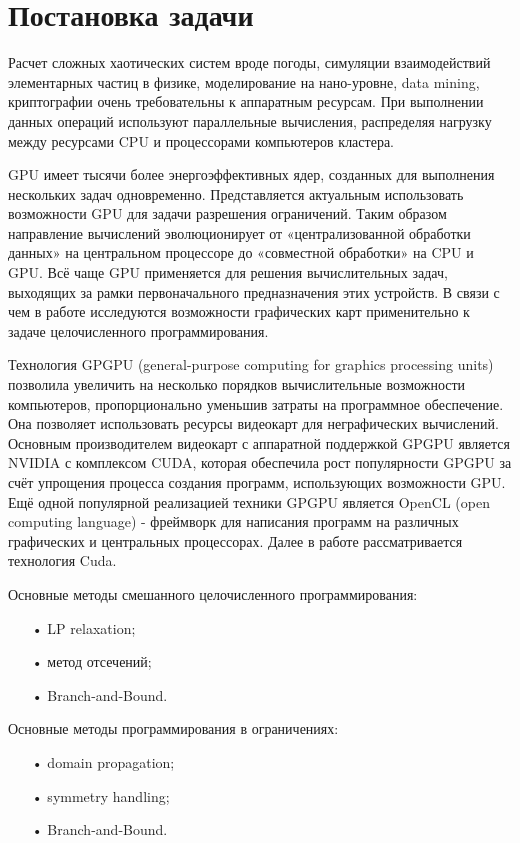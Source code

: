\documentclass[a4paper,14pt,russian]{extreport}
\begin{document}
\section{Постановка задачи}

Расчет сложных хаотических систем вроде погоды, симуляции взаимодействий элементарных частиц в физике, моделирование на нано-уровне, data mining, криптографии очень требовательны к аппаратным ресурсам. При выполнении данных операций используют параллельные вычисления, распределяя нагрузку между ресурсами CPU и процессорами компьютеров кластера.
\par 
GPU имеет тысячи более энергоэффективных ядер, созданных для выполнения нескольких задач одновременно. Представляется актуальным использовать возможности GPU для задачи разрешения ограничений. Таким образом направление вычислений эволюционирует от «централизованной обработки данных» на центральном процессоре до «совместной обработки» на CPU и GPU. Всё чаще GPU применяется для решения вычислительных задач, выходящих за рамки первоначального предназначения этих устройств. В связи с чем в работе исследуются возможности графических карт применительно к задаче целочисленного программирования. 
\par
Технология GPGPU (general-purpose computing for graphics processing units) позволила увеличить на несколько порядков вычислительные возможности компьютеров, пропорционально уменьшив затраты на программное обеспечение. Она позволяет использовать ресурсы видеокарт для неграфических вычислений. Основным производителем видеокарт с аппаратной поддержкой GPGPU является NVIDIA с комплексом CUDA, которая обеспечила рост популярности GPGPU за счёт упрощения процесса создания программ, использующих возможности GPU. Ещё одной популярной реализацией техники GPGPU является OpenCL (open computing language) - фреймворк для написания программ на различных графических и центральных процессорах. Далее в работе рассматривается технология Cuda.
\par
Основные методы смешанного целочисленного программирования:
\begin{itemize}
\item[•] LP relaxation;
\item[•] метод отсечений;
\item[•] Branch-and-Bound.
\end{itemize}
\par
Основные методы программирования в ограничениях:
\begin{itemize}
\item[•] domain propagation;
\item[•] symmetry handling;
\item[•] Branch-and-Bound.
\end{itemize}
\end{document}
